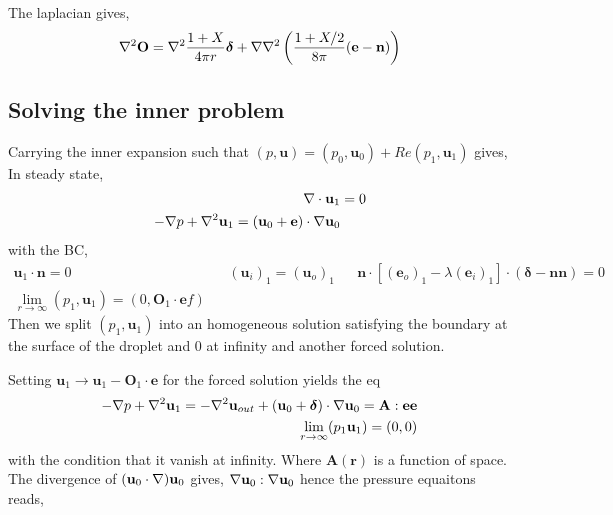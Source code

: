 The laplacian gives, 
\begin{align*}
    \mathbf{\nabla}^2\textbf{O}
    &= 
    \mathbf{\nabla}^2 \frac{1+X}{4\pi r}\bm\delta
    +\mathbf{\nabla}\mathbf{\nabla}^2 \left(\frac{1+X/2}{8\pi} (\textbf{e}-\textbf{n})\right)\\
\end{align*}

\subsection{Solving the inner problem}

Carrying the inner expansion such that $(p,\textbf{u}) = (p_0,\textbf{u}_0)+ Re (p_1,\textbf{u}_1)$ gives,
In steady state,
\begin{align}
    \mathbf{\nabla}\cdot \textbf{u}_1 &= 0
    \\
    -\mathbf{\nabla} p + \mathbf{\nabla}^2 \textbf{u}_1
    = 
    (\textbf{u}_0+ \textbf{e})\cdot \mathbf{\nabla} \textbf{u}_0
\end{align}
with the BC, 
\begin{align}
    \textbf{u}_1 \cdot \textbf{n} = 0 
    &&
    (\textbf{u}_i)_1  =(\textbf{u}_o)_1
    &&
    \textbf{n}\cdot [(\textbf{e}_o)_1 - \lambda(\textbf{e}_i)_1]\cdot (\bm\delta - \textbf{nn})
    =0 \\
    \lim_{r\to \infty }(p_1,\textbf{u}_1)= (0,\textbf{O}_1 \cdot \textbf{e}f)
\end{align}
Then we split $(p_1,\textbf{u}_1)$ into an homogeneous solution satisfying the boundary at the surface of the droplet and $0$ at infinity and another forced solution. 

Setting $\textbf{u}_1 \to \textbf{u}_1 - \textbf{O}_1\cdot \textbf{e}$ for the forced solution yields the eq 
\begin{align}
    -\mathbf{\nabla} p 
    + \mathbf{\nabla}^2 \textbf{u}_1
    = 
    - \mathbf{\nabla}^2 \textbf{u}_{out}
    + (\textbf{u}_0 + \bm\delta) \cdot \mathbf{\nabla} \textbf{u}_0= \textbf{A}: \textbf{ee}\\
    \lim_{r\to\infty} (p_1 \textbf{u}_1) = (0,0)
\end{align}
with the condition that it vanish at infinity. 
Where $\textbf{A}(\textbf{r})$ is a function of space. 
The divergence of $(\textbf{u}_0 \cdot \mathbf{\nabla}) \textbf{u}_0$ gives, $\mathbf{\nabla} \textbf{u}_0 : \mathbf{\nabla} \textbf{u}_0$ hence the pressure equaitons reads, 



